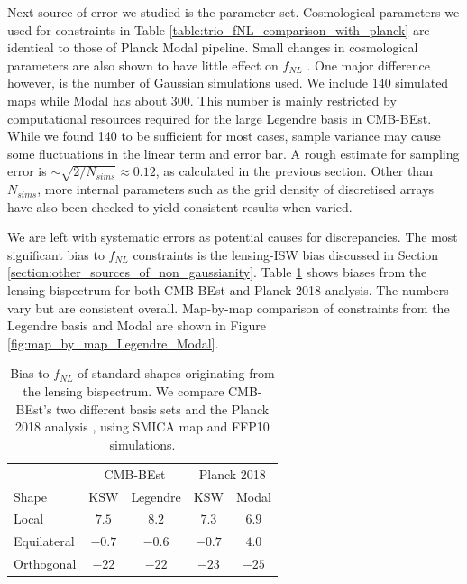 Next source of error we studied is the parameter set. Cosmological parameters we used for constraints in Table \ref{table:trio_fNL_comparison_with_planck} are identical to those of Planck Modal pipeline. Small changes in cosmological parameters are also shown to have little effect on $f_{NL}$ \cite{PlanckCollaboration2015,PlanckCollaboration2018}. One major difference however, is the number of Gaussian simulations used. We include 140 simulated maps while Modal has about 300. This number is mainly restricted by computational resources required for the large Legendre basis in CMB-BEst. While we found 140 to be sufficient for most cases, sample variance may cause some fluctuations in the linear term and error bar. A rough estimate for sampling error is $\sim \sqrt{2/N_{sims}} \approx 0.12$, as calculated in the previous section. Other than $N_{sims}$, more internal parameters such as the grid density of discretised arrays have also been checked to yield consistent results when varied. 

We are left with systematic errors as potential causes for discrepancies. The most significant bias to $f_{NL}$ constraints is the lensing-ISW bias discussed in Section \ref{section:other_sources_of_non_gaussianity}. Table \ref{table:trio_lensing_bias_comparison_with_planck} shows biases from the lensing bispectrum \cite{Lewis2011lensing} for both CMB-BEst and Planck 2018 analysis. The numbers vary but are consistent overall. Map-by-map comparison of constraints from the Legendre basis and Modal are shown in Figure \ref{fig:map_by_map_Legendre_Modal}. 

\begin{table}[h]
	\caption{Bias to $f_{NL}$ of standard shapes originating from the lensing bispectrum. We compare CMB-BEst's two different basis sets and the Planck 2018 analysis \cite{PlanckCollaboration2018}, using SMICA map and FFP10 simulations. }
	\centering
	\label{table:trio_lensing_bias_comparison_with_planck}
	\renewcommand{\arraystretch}{1.5} 
	\begin{tabular}{lcccc}
		\toprule
		& \multicolumn{2}{c}{CMB-BEst} & \multicolumn{2}{c}{Planck 2018} \\ \cmidrule(lr){2-3} \cmidrule(lr){4-5}
		Shape & KSW &  Legendre &  KSW &  Modal \\
		\midrule
		
		Local & $7.5$ & $8.2$ & $7.3$ & $6.9$ \\
		Equilateral & $-0.7$ & $-0.6$ & $-0.7$ & $4.0$\\
		Orthogonal & $-22$ & $-22$ & $-23$ & $-25$ \\
		\bottomrule
	\end{tabular}
\end{table}

